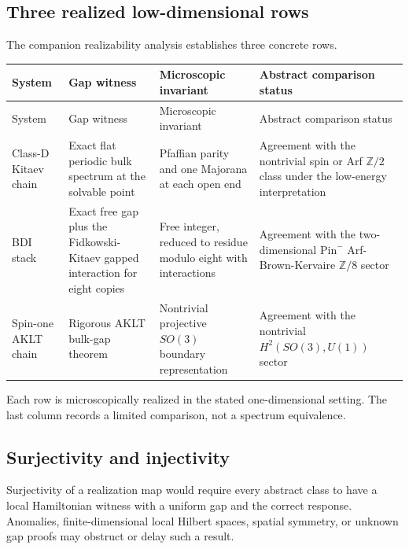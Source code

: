 \documentclass[12pt]{article}
\theoremstyle{definition}
\theoremstyle{remark}
\begin{document}
\subsection{Three realized low-dimensional rows}

The companion realizability analysis establishes three concrete rows.
\begin{longtable}{>{\raggedright\arraybackslash}p{}
                  >{\raggedright\arraybackslash}p{}
                  >{\raggedright\arraybackslash}p{}
                  >{\raggedright\arraybackslash}p{}}
\toprule
System & Gap witness & Microscopic invariant & Abstract comparison status \\
\midrule
\endfirsthead
\toprule
System & Gap witness & Microscopic invariant & Abstract comparison status \\
\midrule
\endhead
Class-D Kitaev chain
& Exact flat periodic bulk spectrum at the solvable point
& Pfaffian parity and one Majorana at each open end
& Agreement with the nontrivial spin or Arf $\mathbb Z/2$ class under the low-energy interpretation \cite{Kitaev2001,FreedHopkins2021} \\

BDI stack
& Exact free gap plus the Fidkowski-Kitaev gapped interaction for eight copies
& Free integer, reduced to residue modulo eight with interactions
& Agreement with the two-dimensional $\mathrm{Pin}^-$ Arf-Brown-Kervaire $\mathbb Z/8$ sector \cite{FidkowskiKitaev2010,FreedHopkins2021} \\

Spin-one AKLT chain
& Rigorous AKLT bulk-gap theorem
& Nontrivial projective $SO(3)$ boundary representation
& Agreement with the nontrivial $H^2(SO(3),U(1))$ sector \cite{AKLT1987,BachmannNachtergaele2014} \\
\bottomrule
\end{longtable}

Each row is microscopically realized in the stated one-dimensional setting.
The last column records a limited comparison, not a spectrum equivalence.

\subsection{Surjectivity and injectivity}

Surjectivity of a realization map would require every abstract class to have
a local Hamiltonian witness with a uniform gap and the correct response.
Anomalies, finite-dimensional local Hilbert spaces, spatial symmetry, or
unknown gap proofs may obstruct or delay such a result.
\end{document}
